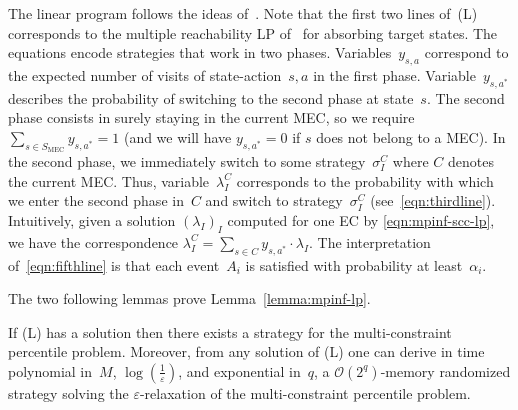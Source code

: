 \documentclass{llncs}
\begin{document}
  The linear program follows the ideas of~\cite{EKVY-lmcs08,BBCFK-lmcs14}. 
  Note that the first two lines of~(L) corresponds to the multiple reachability LP of~\cite{EKVY-lmcs08} for absorbing target states.
The equations encode strategies that work in two phases.
  Variables~$y_{s,a}$ correspond to
  the expected number of visits of state-action~$s,a$ in the first phase. Variable~$y_{s,a^*}$ describes the probability 
  of switching to the second phase at state~$s$.
  The second phase consists in surely staying in the current MEC, so we require $\sum_{s \in S_{\text{MEC}}} y_{s,a^*} = 1$
  (and we will have $y_{s,a^*}=0$ if $s$ does not belong to a MEC).
  In the second phase, we immediately switch to some
	strategy~$\sigma_I^C$ where $C$ denotes the current MEC. Thus, variable~$\lambda_I^C$ corresponds to the probability
  with which we enter the second phase in~$C$ and switch to strategy~$\sigma_I^C$ (see~\eqref{eqn:thirdline}).
  Intuitively, given a solution $(\lambda_I)_I$ computed for one EC by \eqref{eqn:mpinf-scc-lp}, we have the correspondence
  $\lambda_I^C = \sum_{s \in C}y_{s,a^*} \cdot \lambda_I$.
  The interpretation of~\eqref{eqn:fifthline} is that each event~$A_i$ is satisfied with probability at least~$\alpha_i$.

The two following lemmas prove Lemma~\ref{lemma:mpinf-lp}. 

\begin{lemma}
  If (L) has a solution then there exists a strategy for the multi-constraint percentile problem.
  Moreover, from any solution of (L) one can derive in time polynomial in~$M$, $\log(\frac{1}{\varepsilon})$, and exponential in~$q$, a $\mathcal{O}(2^q)$-memory randomized strategy
  solving the $\varepsilon$-relaxation of the multi-constraint percentile problem.
\end{lemma}
\end{document}
